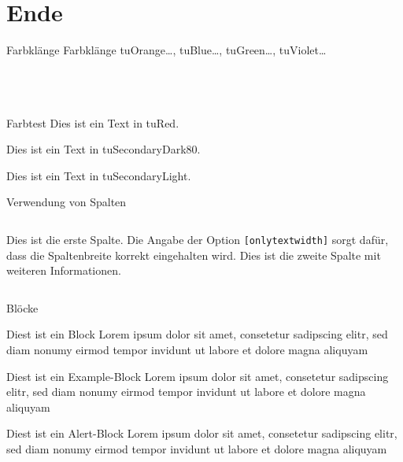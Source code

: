 \documentclass[fleqn,11pt,aspectratio=43]{beamer}
\begin{document}
\section{Ende}


\begin{frame}{Farbklänge}\small
  Farbklänge tuOrange\ldots, tuBlue\ldots, tuGreen\ldots, tuViolet\ldots\\\tiny
  ~\\
  ~\\
  ~\\
\end{frame}


\begin{frame}{Farbtest}
  \color{tuRed}
  Dies ist ein Text in tuRed.

  \color{tuSecondaryDark80}
  Dies ist ein Text in tuSecondaryDark80.

  \color{tuSecondaryLight}
  Dies ist ein Text in tuSecondaryLight.
\end{frame}


\begin{frame}{Verwendung von Spalten}
  \begin{columns}[onlytextwidth]
      Dies ist die erste Spalte.
      Die Angabe der Option \texttt{[onlytextwidth]}
      sorgt dafür, dass die Spaltenbreite korrekt eingehalten wird.
      Dies ist die zweite Spalte mit weiteren Informationen.
  \end{columns}
\end{frame}


\begin{frame}{Blöcke}
  \begin{block}{Diest ist ein Block}
    Lorem ipsum dolor sit amet, consetetur sadipscing elitr, sed diam
    nonumy eirmod tempor invidunt ut labore et dolore magna aliquyam
  \end{block}
  \begin{exampleblock}{Diest ist ein Example-Block}
    Lorem ipsum dolor sit amet, consetetur sadipscing elitr, sed diam
    nonumy eirmod tempor invidunt ut labore et dolore magna aliquyam
  \end{exampleblock}
  \begin{alertblock}{Diest ist ein Alert-Block}
    Lorem ipsum dolor sit amet, consetetur sadipscing elitr, sed diam
    nonumy eirmod tempor invidunt ut labore et dolore magna aliquyam
  \end{alertblock}
\end{frame}
\end{document}
